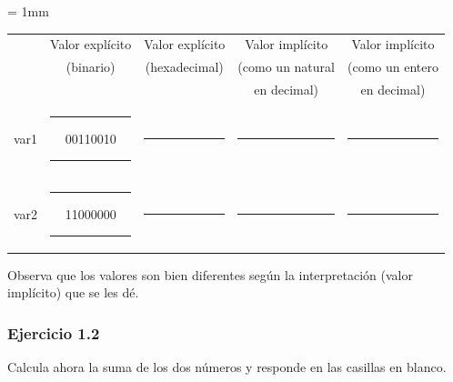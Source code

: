 \begin{center}
\small
\colorbox[gray]{0.9}{
\tabcolsep = 1mm
\begin{tabular}{ccccc}
& Valor explícito & Valor explícito & Valor implícito & Valor implícito \\
 & (binario) & (hexadecimal) & (como un natural & (como un entero \\
& & & en decimal) & en decimal) \\
var1 &
\colorbox[gray]{1}{\rule{0cm}{0.46cm}\rule{0.2cm}{0cm}00110010\rule{0.2cm}{0cm}} &
\colorbox[gray]{1}{\rule{0cm}{0.46cm}\rule{2.6cm}{0cm}} &
\colorbox[gray]{1}{\rule{0cm}{0.46cm}\rule{2.6cm}{0cm}} &
\colorbox[gray]{1}{\rule{0cm}{0.46cm}\rule{2.6cm}{0cm}} \\[1mm]
var2 &
\colorbox[gray]{1}{\rule{0cm}{0.46cm}\rule{0.2cm}{0cm}11000000\rule{0.2cm}{0cm}} &
\colorbox[gray]{1}{\rule{0cm}{0.46cm}\rule{2.6cm}{0cm}} &
\colorbox[gray]{1}{\rule{0cm}{0.46cm}\rule{2.6cm}{0cm}} &
\colorbox[gray]{1}{\rule{0cm}{0.46cm}\rule{2.6cm}{0cm}} \\
\end{tabular}
\vspace{0.5ex}
}
\end{center}

Observa que los valores son bien diferentes según la interpretación (valor
implícito) que se les dé.

\subsubsection{Ejercicio 1.2}
Calcula ahora la suma de los dos números y responde en las casillas en blanco.

